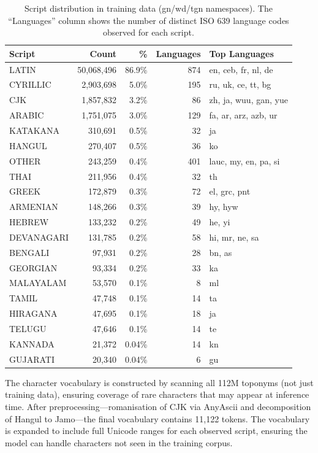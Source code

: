 \documentclass[11pt,a4paper]{article}
\begin{document}
\begin{table}[ht]
\centering
\small
\begin{tabular}{lrrrl}
\toprule
\textbf{Script} & \textbf{Count} & \textbf{\%} & \textbf{Languages} & \textbf{Top Languages} \\
\midrule
LATIN & 50,068,496 & 86.9\% & 874 & en, ceb, fr, nl, de \\
CYRILLIC & 2,903,698 & 5.0\% & 195 & ru, uk, ce, tt, bg \\
CJK & 1,857,832 & 3.2\% & 86 & zh, ja, wuu, gan, yue \\
ARABIC & 1,751,075 & 3.0\% & 129 & fa, ar, arz, azb, ur \\
KATAKANA & 310,691 & 0.5\% & 32 & ja \\
HANGUL & 270,407 & 0.5\% & 36 & ko \\
OTHER & 243,259 & 0.4\% & 401 & lauc, my, en, pa, si \\
THAI & 211,956 & 0.4\% & 32 & th \\
GREEK & 172,879 & 0.3\% & 72 & el, grc, pnt \\
ARMENIAN & 148,266 & 0.3\% & 39 & hy, hyw \\
HEBREW & 133,232 & 0.2\% & 49 & he, yi \\
DEVANAGARI & 131,785 & 0.2\% & 58 & hi, mr, ne, sa \\
BENGALI & 97,931 & 0.2\% & 28 & bn, as \\
GEORGIAN & 93,334 & 0.2\% & 33 & ka \\
MALAYALAM & 53,570 & 0.1\% & 8 & ml \\
TAMIL & 47,748 & 0.1\% & 14 & ta \\
HIRAGANA & 47,695 & 0.1\% & 18 & ja \\
TELUGU & 47,646 & 0.1\% & 14 & te \\
KANNADA & 21,372 & 0.04\% & 14 & kn \\
GUJARATI & 20,340 & 0.04\% & 6 & gu \\
\bottomrule
\end{tabular}
\caption{Script distribution in training data (gn/wd/tgn namespaces). The ``Languages'' column shows the number of distinct ISO 639 language codes observed for each script.}
\label{tab:script-distribution}
\end{table}

The character vocabulary is constructed by scanning all 112M toponyms (not just training data), ensuring coverage of rare characters that may appear at inference time. After preprocessing---romanisation of CJK via AnyAscii and decomposition of Hangul to Jamo---the final vocabulary contains 11,122 tokens. The vocabulary is expanded to include full Unicode ranges for each observed script, ensuring the model can handle characters not seen in the training corpus.
\end{document}
